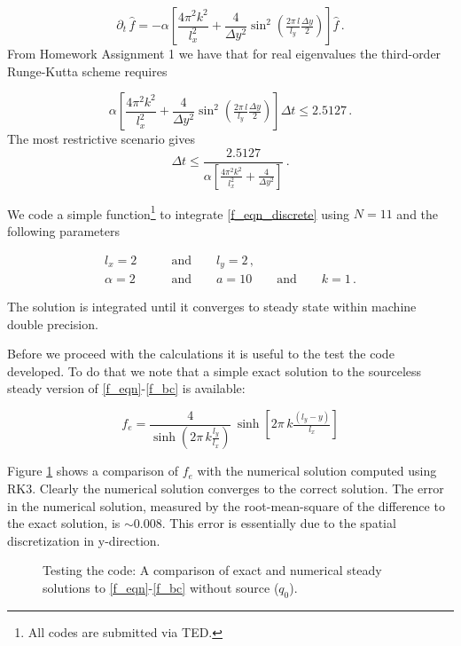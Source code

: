 \documentclass[11pt]{article}
\newcommand{\com}{\, ,}
\newcommand{\per}{\, .}
\def\beq{\begin{equation}}
\def\eeq{\end{equation}}
\begin{document}
\begin{enumerate}[label=(\alph*)]
        \beq
        \partial_t\,\hat f = - \alpha\left[\frac{4\pi^2k^2}{l_x^2} + \frac{4}{\Delta y^2}\sin^2\left(\tfrac{2\pi\,l}{l_y}\tfrac{\Delta y}{2}\right)\right] \hat f \per
        \eeq
        From Homework Assignment 1 we have that for real eigenvalues the third-order Runge-Kutta scheme requires

        \beq
             \alpha\left[\frac{4\pi^2k^2}{l_x^2} + \frac{4}{\Delta y^2}\sin^2\left(\tfrac{2\pi\,l}{l_y}\tfrac{\Delta y}{2}\right)\right] \Delta t \leq 2.5127\per
        \eeq
        The most restrictive scenario gives 
        \beq
        \label{stability_rk3}
        \Delta t \leq \frac{2.5127}{\alpha\left[\frac{4\pi^2k^2}{l_x^2} + \frac{4}{\Delta y^2}\right] }\per
        \eeq

        We code a simple function\footnote{All codes are submitted via TED.} to integrate \eqref{f_eqn_discrete} using $N=11$ and the following parameters

        \begin{align}
            l_x = 2& \qquad\text{and}\qquad l_y=2\com \nonumber\\
            \alpha = 2 & \qquad\text{and}\qquad a=10 \qquad \text{and}\qquad k=1\per
        \end{align}


        The solution is integrated until it converges to steady state within machine double precision. 
        
        Before we proceed with the calculations it is useful to the test the code developed. To do that we note that a simple exact solution to the sourceless steady version of \eqref{f_eqn}-\eqref{f_bc} is available:

        \beq
            \label{f_bcc}
            f_e  = \frac{4}{\sinh{\left(2\pi\,k\tfrac{l_y}{l_x}\right)}}\,\sinh{\left[2\pi\,k\tfrac{\left(l_y-y\right)}{l_x}\right]}
        \eeq


        Figure \ref{comp_exact} shows a comparison of $f_e$ with the numerical solution computed using RK3. Clearly the numerical solution converges to the correct solution. The error in the numerical solution, measured by the root-mean-square of the difference to the exact solution, is $\sim 0.008$. This error is essentially due to the spatial discretization in y-direction.

        \begin{figure}[p]
        \centerline{}
        \caption{Testing the code: A comparison of exact and numerical steady solutions to  \eqref{f_eqn}-\eqref{f_bc} without source ($q_0$).}
        \label{comp_exact}
        \end{figure}



\end{enumerate}
\end{document}
